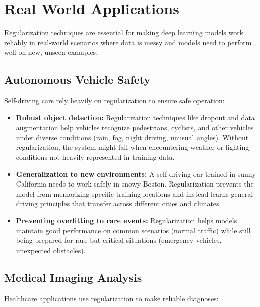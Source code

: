 
\section{Real World Applications}
\label{sec:regularization-real-world}


Regularization techniques are essential for making deep learning models work reliably in real-world scenarios where data is messy and models need to perform well on new, unseen examples.

\subsection{Autonomous Vehicle Safety}

Self-driving cars rely heavily on regularization to ensure safe operation:

\begin{itemize}
    \item \textbf{Robust object detection:} Regularization techniques like dropout and data augmentation help vehicles recognize pedestrians, cyclists, and other vehicles under diverse conditions (rain, fog, night driving, unusual angles). Without regularization, the system might fail when encountering weather or lighting conditions not heavily represented in training data.
    
    \item \textbf{Generalization to new environments:} A self-driving car trained in sunny California needs to work safely in snowy Boston. Regularization prevents the model from memorizing specific training locations and instead learns general driving principles that transfer across different cities and climates.
    
    \item \textbf{Preventing overfitting to rare events:} Regularization helps models maintain good performance on common scenarios (normal traffic) while still being prepared for rare but critical situations (emergency vehicles, unexpected obstacles).
\end{itemize}

\subsection{Medical Imaging Analysis}

Healthcare applications use regularization to make reliable diagnoses:

